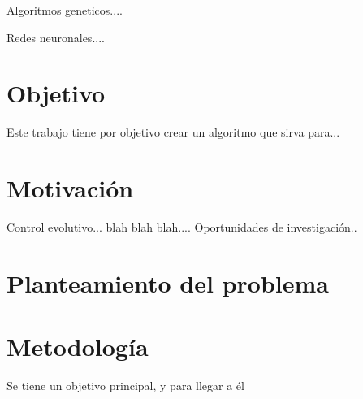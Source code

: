 Algoritmos geneticos.... 

Redes neuronales.... 



\blindtext

\section{Objetivo}

Este trabajo tiene por objetivo crear un algoritmo que sirva para...
 
\blindtext
\section{Motivación}

Control evolutivo... blah blah blah.... Oportunidades de investigación..

\blindtext
\section{Planteamiento del problema}



\blindtext
\section{Metodología} 

Se tiene un objetivo principal, y para llegar a \'el %


\blindtext

